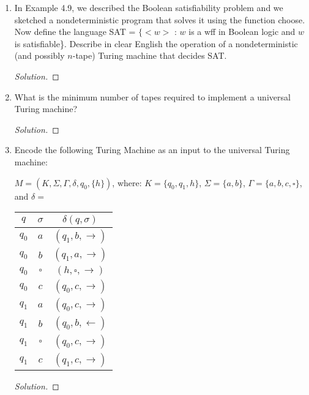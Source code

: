 \documentclass[10pt]{article}
\begin{document}
\begin{enumerate}[1)]
\item
In Example 4.9, we described the Boolean satisfiability problem and we sketched a nondeterministic program 
that solves it using the function choose.  Now define the language SAT = $\{<w>$ : $w$ is a wff in Boolean logic 
and $w$ is satisfiable\}.  Describe in clear English the operation of a nondeterministic (and possibly $n$-tape) Turing 
machine that decides SAT.
\begin{proof}[Solution]
\end{proof}


\item
What is the minimum number of tapes required to implement a universal Turing machine?
\begin{proof}[Solution]
\end{proof}


\item
Encode the following Turing Machine as an input to the universal Turing machine:
\begin{center}
$M = (K, \Sigma, \Gamma, \delta, q_0, \{h\})$, where:   $K = \{q_0, q_1, h\}$,  $\Sigma = \{a, b\}$,  $\Gamma = \{a, b, c, \square\}$, and $\delta =$\\
\vspace{.5cm}
\begin{tabular}{|c|c|c|}
\hline
$q$&$\sigma$&$\delta(q, \sigma)$\\ \hline
$q_0$&$a$&$(q_1, b, \rightarrow)$\\ \hline
$q_0$&$b$&$(q_1, a, \rightarrow)$\\ \hline
$q_0$&$\square$&$(h, \square, \rightarrow)$\\ \hline
$q_0$&$c$&$(q_0, c, \rightarrow)$\\ \hline
$q_1$&$a$&$(q_0, c, \rightarrow)$\\ \hline
$q_1$&$b$&$(q_0, b, \leftarrow)$\\ \hline
$q_1$&$\square$&$(q_0, c, \rightarrow)$\\ \hline
$q_1$&$c$&$(q_1, c, \rightarrow)$\\
\hline
\end{tabular}
\end{center}
\begin{proof}[Solution]
\end{proof}



\end{enumerate}
\end{document}
